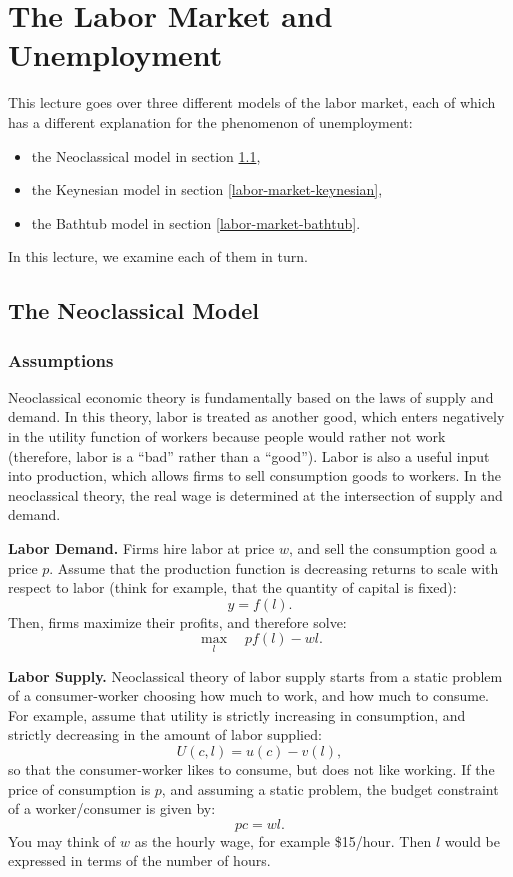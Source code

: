 \documentclass[]{book}
\providecommand{\tightlist}{%
  \setlength{\itemsep}{0pt}\setlength{\parskip}{0pt}}
\begin{document}
\hypertarget{labor-market}{\chapter{The Labor Market and
Unemployment}\label{labor-market}}

This lecture goes over three different models of the labor market, each
of which has a different explanation for the phenomenon of unemployment:

\begin{itemize}
\tightlist
\item
  the Neoclassical model in section \ref{labor-market-neoclassical},
\item
  the Keynesian model in section \ref{labor-market-keynesian},
\item
  the Bathtub model in section \ref{labor-market-bathtub}.
\end{itemize}

In this lecture, we examine each of them in turn.

\section{The Neoclassical Model}\label{labor-market-neoclassical}

\subsection{Assumptions}\label{assumptions-2}

Neoclassical economic theory is fundamentally based on the laws of
supply and demand. In this theory, labor is treated as another good,
which enters negatively in the utility function of workers because
people would rather not work (therefore, labor is a ``bad'' rather than
a ``good''). Labor is also a useful input into production, which allows
firms to sell consumption goods to workers. In the neoclassical theory,
the real wage is determined at the intersection of supply and demand.

\textbf{Labor Demand.} Firms hire labor at price \(w\), and sell the
consumption good a price \(p\). Assume that the production function is
decreasing returns to scale with respect to labor (think for example,
that the quantity of capital is fixed): \[y = f(l).\] Then, firms
maximize their profits, and therefore solve:
\[\max_l \quad pf(l) - wl.\]

\textbf{Labor Supply.} Neoclassical theory of labor supply starts from a
static problem of a consumer-worker choosing how much to work, and how
much to consume. For example, assume that utility is strictly increasing
in consumption, and strictly decreasing in the amount of labor supplied:
\[U(c, l)=u(c)-v(l),\] so that the consumer-worker likes to consume, but
does not like working. If the price of consumption is \(p\), and
assuming a static problem, the budget constraint of a worker/consumer is
given by: \[pc = wl.\] You may think of \(w\) as the hourly wage, for
example \$15/hour. Then \(l\) would be expressed in terms of the number
of hours.
\end{document}
